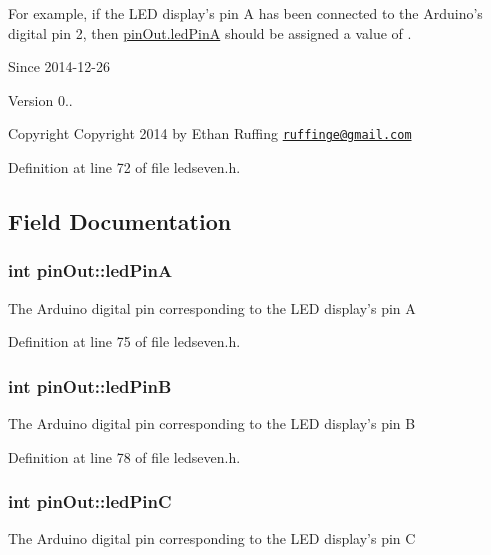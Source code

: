 For example, if the L\+E\+D display's pin A has been connected to the Arduino's digital pin 2, then {\ttfamily \hyperlink{structpin_out_a54c52aca2a7fdccb479c5a6913990e63}{pin\+Out.\+led\+Pin\+A}} should be assigned a value of {}.

\begin{DoxySince}{Since}
2014-\/12-\/26 
\end{DoxySince}
\begin{DoxyVersion}{Version}
0..
\end{DoxyVersion}
\begin{DoxyCopyright}{Copyright}
Copyright 2014 by Ethan Ruffing \href{mailto:ruffinge@gmail.com}{\tt ruffinge@gmail.\+com} 
\end{DoxyCopyright}


Definition at line 72 of file ledseven.\+h.



\subsection{Field Documentation}
\hypertarget{structpin_out_a54c52aca2a7fdccb479c5a6913990e63}{
\subsubsection[{led\+Pin\+A}]{\setlength{\rightskip}{0pt plus 5cm}int pin\+Out\+::led\+Pin\+A}}\label{structpin_out_a54c52aca2a7fdccb479c5a6913990e63}
The Arduino digital pin corresponding to the L\+E\+D display's pin A 

Definition at line 75 of file ledseven.\+h.

\hypertarget{structpin_out_af3461f90e21457cdb1f46a3d8085ac06}{
\subsubsection[{led\+Pin\+B}]{\setlength{\rightskip}{0pt plus 5cm}int pin\+Out\+::led\+Pin\+B}}\label{structpin_out_af3461f90e21457cdb1f46a3d8085ac06}
The Arduino digital pin corresponding to the L\+E\+D display's pin B 

Definition at line 78 of file ledseven.\+h.

\hypertarget{structpin_out_afb9d6f76a96cc304defd23f3be3a0c9d}{
\subsubsection[{led\+Pin\+C}]{\setlength{\rightskip}{0pt plus 5cm}int pin\+Out\+::led\+Pin\+C}}\label{structpin_out_afb9d6f76a96cc304defd23f3be3a0c9d}
The Arduino digital pin corresponding to the L\+E\+D display's pin C 

